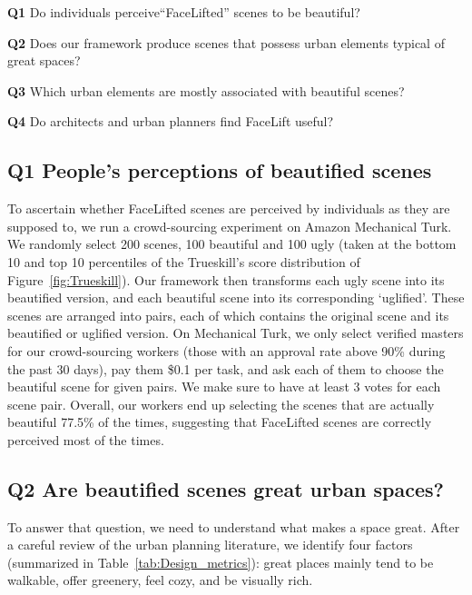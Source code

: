 \begin{description}
    \item{\textbf{Q1}} Do individuals perceive``FaceLifted'' scenes to be beautiful?
    
    \item{\textbf{Q2}}  Does our framework produce scenes that possess urban elements typical of great spaces?
    
    \item{\textbf{Q3}}  Which urban elements are mostly associated with beautiful scenes?
    
    \item{\textbf{Q4}}  Do architects and urban planners find FaceLift useful?
    
\end{description}


\subsection*{Q1 People's perceptions of beautified scenes}
To ascertain whether FaceLifted scenes are perceived by individuals as they are supposed to, we run a crowd-sourcing experiment on Amazon Mechanical Turk.  We randomly select 200 scenes, 100 beautiful and 100 ugly  (taken at the bottom 10 and top 10 percentiles of the Trueskill's score distribution of Figure~\ref{fig:Trueskill}). Our framework then transforms each ugly scene into its beautified version, and each beautiful scene into its corresponding `uglified'. These scenes are arranged into pairs, each of which contains the original scene and its beautified or uglified version. On  Mechanical Turk, we only select verified masters for our crowd-sourcing workers (those with an approval rate above 90\% during the past 30 days), pay them \$0.1 per  task,  and ask each of them to choose the beautiful scene for given pairs.  We make sure to have at least 3 votes for each scene pair. Overall, our workers end up selecting the scenes that are actually beautiful 77.5\% of the times, suggesting that FaceLifted scenes are correctly perceived most of the times.


\subsection*{Q2 Are beautified scenes great urban spaces?}
To answer that question, we need to understand what makes a space great. After a careful review of the urban planning literature, we identify four factors~\cite{ewing2013measuring,alexander1977pattern} (summarized in Table~\ref{tab:Design_metrics}): great places mainly tend to be walkable, offer greenery, feel cozy, and be visually rich. 


